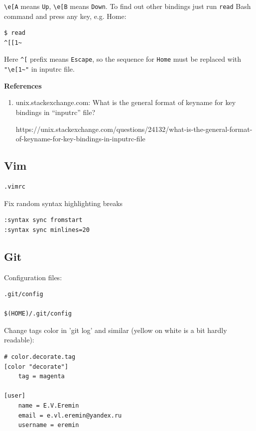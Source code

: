 \documentclass[12pt,a4paper]{article}
\begin{document}
\verb"\e[A" means \verb"Up", \verb"\e[B" means \verb"Down".  To find out other 
bindings just run \verb"read" Bash command and press any key, e.g. Home:
\begin{verbatim}
$ read
^[[1~
\end{verbatim}

Here \verb"^[" prefix means \verb"Escape", so the sequence for \verb"Home" must 
be replaced with \verb'"\e[1~"' in inputrc file.

\textbf{References}

\begin{enumerate}
\item unix.stackexchange.com: What is the general format of keyname for key 
bindings in “inputrc” file?

	https://unix.stackexchange.com/questions/24132/what-is-the-general-format-of-keyname-for-key-bindings-in-inputrc-file
\end{enumerate}

\subsection{Vim}

\begin{verbatim}
.vimrc
\end{verbatim}

Fix random syntax highlighting breaks

\begin{verbatim}
:syntax sync fromstart
:syntax sync minlines=20
\end{verbatim}

\subsection{Git}

Configuration files:

\begin{verbatim}
.git/config

$(HOME)/.git/config
\end{verbatim}

Change tags color in 'git log' and similar (yellow on white is a bit hardly 
readable):
\begin{verbatim}
# color.decorate.tag
[color "decorate"]
    tag = magenta

[user]
    name = E.V.Eremin
    email = e.vl.eremin@yandex.ru
    username = eremin
\end{verbatim}
\end{document}
